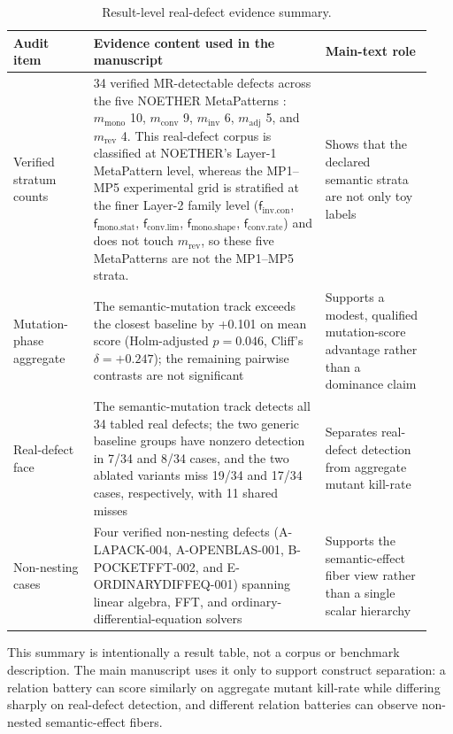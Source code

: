 \documentclass[manuscript,screen,review]{acmart}
\begin{document}
{%
\small
\begin{longtable}[]{@{}p{0.18\linewidth}p{0.52\linewidth}p{0.24\linewidth}@{}}
\caption{Result-level real-defect evidence summary.}\label{tab:realdefect-ledger}\\
\toprule\noalign{}
Audit item & Evidence content used in the manuscript & Main-text role \\
\midrule\noalign{}
\endfirsthead
\endhead
\bottomrule\noalign{}
\endlastfoot
Verified stratum counts & 34 verified MR-detectable defects across the five
NOETHER MetaPatterns \citep{noether2026}: \(m_{\mathrm{mono}}\) 10,
\(m_{\mathrm{conv}}\) 9,
\(m_{\mathrm{inv}}\) 6, \(m_{\mathrm{adj}}\) 5, and
\(m_{\mathrm{rev}}\) 4. This real-defect corpus is classified at NOETHER's
Layer-1 MetaPattern level, whereas the MP1--MP5 experimental grid is
stratified at the finer Layer-2 family level
(\(\mathsf{f}_{\mathrm{inv.con}}\), \(\mathsf{f}_{\mathrm{mono.stat}}\),
\(\mathsf{f}_{\mathrm{conv.lim}}\), \(\mathsf{f}_{\mathrm{mono.shape}}\),
\(\mathsf{f}_{\mathrm{conv.rate}}\)) and does not touch \(m_{\mathrm{rev}}\),
so these five MetaPatterns are not the MP1--MP5 strata. & Shows that the
declared semantic strata are not
only toy labels \\
Mutation-phase aggregate & The semantic-mutation track exceeds the
closest baseline by +0.101 on mean score (Holm-adjusted \(p = 0.046\),
Cliff's \(\delta = +0.247\)); the remaining pairwise contrasts are not
significant & Supports a modest, qualified
mutation-score advantage rather than a dominance claim \\
Real-defect face & The semantic-mutation track detects all 34 tabled
real defects; the two generic baseline groups have nonzero detection in
7/34 and 8/34 cases, and the two ablated variants miss 19/34 and 17/34
cases, respectively, with 11 shared misses & Separates real-defect detection from aggregate mutant
kill-rate \\
Non-nesting cases & Four verified non-nesting defects (A-LAPACK-004,
A-OPENBLAS-001, B-POCKETFFT-002, and E-ORDINARYDIFFEQ-001) spanning
linear
algebra, FFT, and ordinary-differential-equation solvers & Supports the semantic-effect fiber view rather
than a single scalar hierarchy \\
\end{longtable}
\normalsize
}

This summary is intentionally a result table, not a corpus or benchmark
description. The main manuscript uses it only to support construct
separation: a relation battery can score similarly on aggregate mutant
kill-rate while differing sharply on real-defect detection, and different
relation batteries can observe non-nested semantic-effect fibers.
\end{document}
